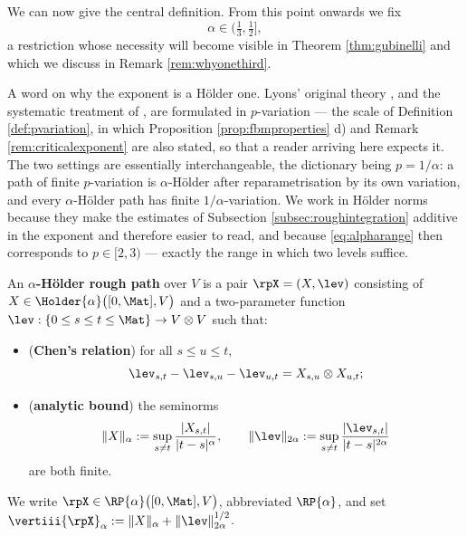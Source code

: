 We can now give the central definition. From this point onwards we fix
\begin{equation}\label{eq:alpharange}
\alpha \in \bigl(\tfrac13, \tfrac12\bigr],
\end{equation}
a restriction whose necessity will become visible in Theorem \ref{thm:gubinelli} and which we
discuss in Remark \ref{rem:whyonethird}.

A word on why the exponent is a Hölder one. Lyons' original theory \cite{lyons1998}, and the
systematic treatment of \cite{frizvictoir2010}, are formulated in $p$-variation --- the scale of
Definition \ref{def:pvariation}, in which Proposition \ref{prop:fbmproperties} d) and Remark
\ref{rem:criticalexponent} are also stated, so that a reader arriving here expects it. The two
settings are essentially interchangeable, the dictionary being $p = 1/\alpha$: a path of finite
$p$-variation is $\alpha$-Hölder after reparametrisation by its own variation, and every
$\alpha$-Hölder path has finite $1/\alpha$-variation. We work in Hölder norms because they make the
estimates of Subsection \ref{subsec:roughintegration} additive in the exponent and therefore easier
to read, and because \eqref{eq:alpharange} then corresponds to $p \in [2,3)$ --- exactly the range
in which two levels suffice.

\begin{definition}\label{def:roughpath}
An \textbf{$\alpha$-Hölder rough path} over $V$ is a pair $\rpX = (X,\lev)$ consisting of
$X \in \Holder{\alpha}\bigl([0,\Mat],V\bigr)$ and a two-parameter function
$\lev : \{0\leq s\leq t\leq \Mat\} \to V\otimes V$ such that:
\begin{itemize}
    \item[i)] (\textbf{Chen's relation}) for all $s\leq u\leq t$,
    \begin{equation}\label{eq:chenaxiom}
    \lev_{s,t} - \lev_{s,u} - \lev_{u,t} = X_{s,u}\otimes X_{u,t};
    \end{equation}
    \item[ii)] (\textbf{analytic bound}) the seminorms
    \begin{equation}\label{eq:rpnorms}
    \lVert X\rVert_{\alpha} := \sup_{s\neq t}\frac{|X_{s,t}|}{|t-s|^{\alpha}}, \qquad
    \lVert \lev\rVert_{2\alpha} := \sup_{s\neq t}\frac{|\lev_{s,t}|}{|t-s|^{2\alpha}}
    \end{equation}
    are both finite.
\end{itemize}
We write $\rpX \in \RP{\alpha}\bigl([0,\Mat],V\bigr)$, abbreviated $\RP{\alpha}$, and set
$\vertiii{\rpX}_{\alpha} := \lVert X\rVert_\alpha + \lVert\lev\rVert_{2\alpha}^{1/2}$.
\end{definition}

